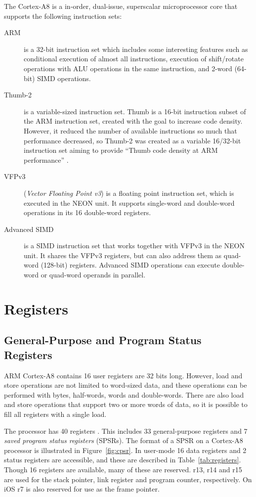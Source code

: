 \documentclass[oneside,a4paper]{report}
\begin{document}
The Cortex-A8 is a in-order, dual-issue, superscalar microprocessor core that supports the following instruction sets:
\begin{description}
	\item[ARM] is a 32-bit instruction set which includes some interesting features such as conditional execution of almost all instructions, execution of shift/rotate operations with ALU operations in the same instruction, and 2-word (64-bit) SIMD operations.
	
	\item[Thumb-2] is a variable-sized instruction set. Thumb is a 16-bit instruction subset of the ARM instruction set, created with the goal to increase code density. However, it reduced the number of available instructions so much that performance decreased, so Thumb-2 was created as a variable 16/32-bit instruction set aiming to provide ``Thumb code density at ARM performance'' \cite[p. 5]{Gris}.
	
	\item[VFPv3] (\emph{Vector Floating Point v3}) is a floating point instruction set, which is executed in the NEON unit. It supports single-word and double-word operations in its 16 double-word registers.
	
	\item[Advanced SIMD] is a SIMD instruction set that works together with VFPv3 in the NEON unit. It shares the VFPv3 registers, but can also address them as quad-word (128-bit) registers. Advanced SIMD operations can execute double-word or quad-word operands in parallel.
\end{description}

\chapter{Registers}

\section{General-Purpose and Program Status Registers}
ARM Cortex-A8 contains 16 user registers are 32 bits long. However, load and store operations are not limited to word-sized data, and these operations can be performed with bytes, half-words, words and double-words. There are also load and store operations that support two or more words of data, so it is possible to fill all registers with a single load.

The processor has 40 registers \cite[p. 2-18]{A8Ref}. This includes 33 general-purpose registers and 7 \emph{saved program status registers} (SPSRs). The format of a SPSR on a Cortex-A8 processor is illustrated in Figure~\ref{fig:cpsr}. In user-mode 16 data registers and 2 status registers are accessible, and these are described in Table~\ref{tab:registers}. Though 16 registers are available, many of these are reserved. r13, r14 and r15 are used for the stack pointer, link register and program counter, respectively. On iOS r7 is also reserved for use as the frame pointer.
\end{document}
